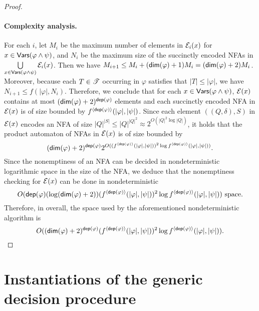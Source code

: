 \begin{proof}
\paragraph{Complexity analysis.} For each $i$, 
let $M_i$ be the maximum number of elements in $\mathcal{E}_i(x)$ for $x  \in \mathsf{Vars}(\varphi \wedge \psi)$,
and $N_i$ be the maximum size of the succinctly encoded NFAs in $\bigcup \limits_{x \in \mathsf{Vars}(\varphi \wedge \psi)} \mathcal{E}_i(x)$.
Then we have $M_{i+1} \le M_i + (\mathsf{dim}(\varphi)+1)M_i = (\mathsf{dim}(\varphi)+2) M_i$. Moreover,  because each $T \in \mathscr{T}$ occurring in $\varphi$ satisfies that $|T| \le |\varphi|$, we have $N_{i+1} \le f(|\varphi|, N_i)$. Therefore, we conclude that for each $x \in \mathsf{Vars}(\varphi \wedge \psi)$, $\mathcal{E}(x)$ contains at most $(\mathsf{dim}(\varphi)+2)^{\mathsf{dep}(\varphi)}$ elements and each succinctly encoded NFA in $\mathcal{E}(x)$ is of size bounded by $f^{\langle \mathsf{dep}(\varphi) \rangle}(|\varphi|, |\psi|)$. 
Since each element $((Q, \delta), S)$ in $\mathcal{E}(x)$ encodes an NFA of size $|Q|^{|S|} \le |Q|^{|Q|^2} \approx 2^{O(|Q|^2 \log |Q|)}$, it holds that the product automaton of NFAs in $\mathcal{E}(x)$ is of size bounded by 
$$(\mathsf{dim}(\varphi)+2)^{\mathsf{dep}(\varphi)} 2^{O((f^{\langle \mathsf{dep}(\varphi) \rangle}(|\varphi|, |\psi|))^2 \log f^{\langle \mathsf{dep}(\varphi) \rangle}(|\varphi|, |\psi|) )}.$$
Since the nonemptiness of an NFA 
can be decided in nondeterministic logarithmic space in the size of the NFA, we deduce that the nonemptiness checking for $\mathcal{E}(x)$ can be done in nondeterministic 
$$O(\mathsf{dep}(\varphi) (\log (\mathsf{dim}(\varphi)+2)) (f^{\langle \mathsf{dep}(\varphi) \rangle}(|\varphi|, |\psi|))^2 \log f^{\langle \mathsf{dep}(\varphi) \rangle}(|\varphi|, |\psi|)) \mbox{ space.}$$
%
Therefore, in overall, the space used by the aforementioned nondeterministic algorithm is 
$$O((\mathsf{dim}(\varphi)+2)^{\mathsf{dep}(\varphi)} (f^{\langle \mathsf{dep}(\varphi) \rangle}(|\varphi|, |\psi|))^2 \log f^{\langle \mathsf{dep}(\varphi) \rangle}(|\varphi|, |\psi|)).$$ 
\end{proof}

\section{Instantiations of the generic decision procedure}
 
